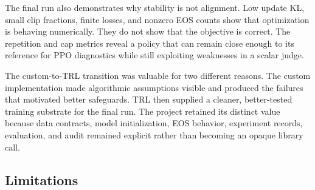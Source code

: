\documentclass[11pt]{article}
\newcommand{\trl}{\textsc{TRL}}
\begin{document}
The final run also demonstrates why stability is not alignment. Low update KL,
small clip fractions, finite losses, and nonzero EOS counts show that
optimization is behaving numerically. They do not show that the objective is
correct. The repetition and cap metrics reveal a policy that can remain close
enough to its reference for PPO diagnostics while still exploiting weaknesses
in a scalar judge.

The custom-to-\trl{} transition was valuable for two different reasons. The
custom implementation made algorithmic assumptions visible and produced the
failures that motivated better safeguards. \trl{} then supplied a cleaner,
better-tested training substrate for the final run. The project retained its
distinct value because data contracts, model initialization, EOS behavior,
experiment records, evaluation, and audit remained explicit rather than
becoming an opaque library call.

\subsection{Limitations}
\end{document}
